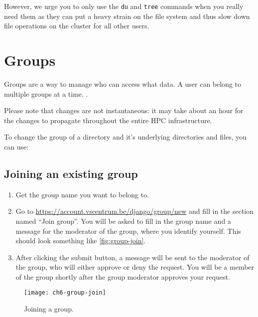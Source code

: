 However, we urge you to only use the \texttt{du} and \texttt{tree} commands when you
really need them as they can put a heavy strain on the file system and thus
slow down file operations on the cluster for all other users.
\fi

\section{Groups}
\label{sec:vcs-groups}

Groups are a way to manage who can access what data. A user can belong to multiple
groups at a time. .

Please note that changes are not instantaneous: it may take about an hour for the changes to propagate
throughout the entire HPC infrastructure.

To change the group of a directory and it's underlying directories and files, you can use:

\begin{prompt}
\end{prompt}

\subsection{Joining an existing group}
\label{subsec:joining-existing-group}

\begin{enumerate}
    \item Get the group name you want to belong to.
    \item Go to \url{https://account.vscentrum.be/django/group/new} and fill in the
        section named ``Join group''. You will be asked to fill in the group name and a message for
        the moderator of the group, where you identify yourself. This should look something
        like \autoref{fig:group-join}.
    \item After clicking the submit button, a message will be sent to the moderator
        of the group, who will either approve or deny the request. You will be a member of the
        group shortly after the group moderator approves your request.
\end{enumerate}

\begin{figure}[!htbp]
  \caption{Joining a group.}
  \centering
    \texttt{[image: ch6-group-join]}
\end{figure}\label{fig:group-join}

